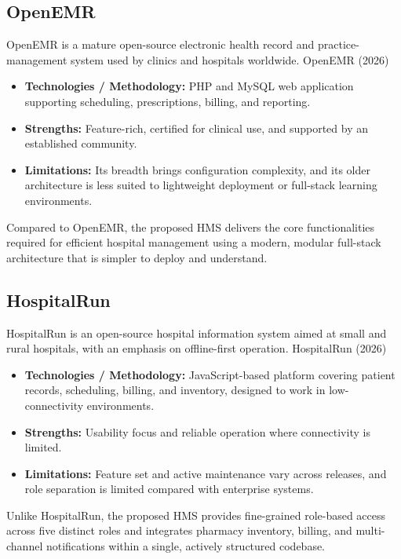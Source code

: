 \documentclass[12pt,a4paper]{report}
\begin{document}
\subsection*{OpenEMR}
OpenEMR is a mature open-source electronic health record and practice-management
system used by clinics and hospitals worldwide. OpenEMR (2026)
\begin{itemize}[leftmargin=1.4em, itemsep=1pt]
  \item \textbf{Technologies / Methodology:} PHP and MySQL web application supporting
        scheduling, prescriptions, billing, and reporting.
  \item \textbf{Strengths:} Feature-rich, certified for clinical use, and supported
        by an established community.
  \item \textbf{Limitations:} Its breadth brings configuration complexity, and its
        older architecture is less suited to lightweight deployment or full-stack
        learning environments.
\end{itemize}
Compared to OpenEMR, the proposed HMS delivers the core functionalities required for
efficient hospital management using a modern, modular full-stack architecture that is
simpler to deploy and understand.

\subsection*{HospitalRun}
HospitalRun is an open-source hospital information system aimed at small and rural
hospitals, with an emphasis on offline-first operation. HospitalRun (2026)
\begin{itemize}[leftmargin=1.4em, itemsep=1pt]
  \item \textbf{Technologies / Methodology:} JavaScript-based platform covering
        patient records, scheduling, billing, and inventory, designed to work in
        low-connectivity environments.
  \item \textbf{Strengths:} Usability focus and reliable operation where connectivity
        is limited.
  \item \textbf{Limitations:} Feature set and active maintenance vary across releases,
        and role separation is limited compared with enterprise systems.
\end{itemize}
Unlike HospitalRun, the proposed HMS provides fine-grained role-based access across
five distinct roles and integrates pharmacy inventory, billing, and multi-channel
notifications within a single, actively structured codebase.
\end{document}
